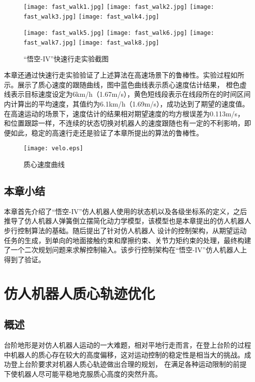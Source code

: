 \begin{figure}[htbp]
    \centering
    \texttt{[image: fast\_walk1.jpg]}
    \texttt{[image: fast\_walk2.jpg]}
    \texttt{[image: fast\_walk3.jpg]}
    \texttt{[image: fast\_walk4.jpg]}

    \texttt{[image: fast\_walk5.jpg]}
    \texttt{[image: fast\_walk6.jpg]}
    \texttt{[image: fast\_walk7.jpg]}
    \texttt{[image: fast\_walk8.jpg]}   
    \caption{\label{fig:fast_walk}“悟空-IV”快速行走实验截图}
\end{figure}

本章还通过快速行走实验验证了上述算法在高速场景下的鲁棒性。实验过程如所示。展示了质心速度的跟随曲线，图中蓝色曲线表示质心速度估计结果，
橙色虚线表示目标速度设定为6km/h（1.67m/s），黄色短线段表示在线段所在的时间区间内计算出的平均速度，其值约为6.1km/h（1.69m/s），成功达到了期望的速度值。
在高速运动的场景下，速度估计的结果相对期望速度的均方根误差为0.113m/s，和位置跟踪一样，不连续的状态切换对机器人的速度跟随也有一定的不利影响，即便如此，稳定的高速行走还是验证了本章所提出的算法的鲁棒性。
\begin{figure}[htbp]
    \centering
    \texttt{[image: velo.eps]}
    \caption{\label{fig:com_vel_track}质心速度曲线}
\end{figure}
\section{本章小结}
本章首先介绍了“悟空-IV”仿人机器人使用的状态机以及各级坐标系的定义，之后推导了仿人机器人弹簧倒立摆简化动力学模型，该模型也是本章提出的仿人机器人步行控制算法的基础。随后提出了针对仿人机器人
设计的控制架构，从期望运动任务的生成，到单向的地面接触约束和摩擦约束、关节力矩约束的处理，最终构建了一个二次规划问题来求解控制输入。该步行控制架构在“悟空-IV”仿人机器人上得到了验证。
\chapter{仿人机器人质心轨迹优化}
\section{概述}
台阶地形是对仿人机器人运动的一大难题，相对平地行走而言，在登上台阶的过程中机器人的质心存在较大的高度偏移，这对运动控制的稳定性是相当大的挑战。成功登上台阶要求对机器人质心轨迹做出合理的规划，
在满足各种运动限制的前提下使机器人尽可能平稳地克服质心高度的突然升高。


